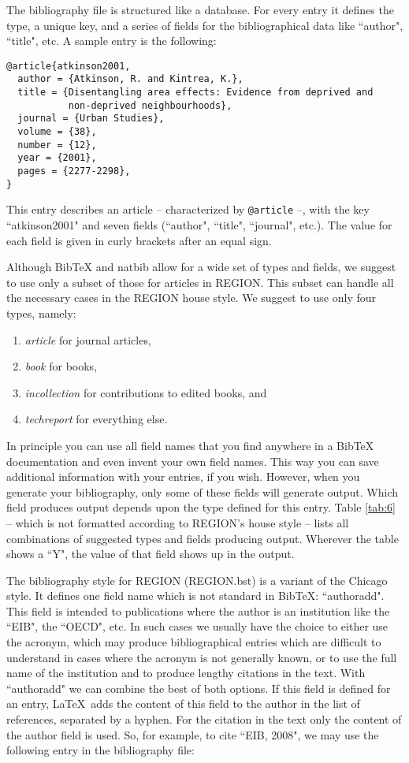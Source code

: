 \documentclass[a4paper,twoside]{article}
\begin{document}
The bibliography file is structured like a database. For every entry it defines the type, a unique key, and a series of fields for the bibliographical data like ``author", ``title", etc. A sample entry is the following:

\begin{verbatim}
@article{atkinson2001,
  author = {Atkinson, R. and Kintrea, K.},
  title = {Disentangling area effects: Evidence from deprived and 
           non-deprived neighbourhoods},
  journal = {Urban Studies},
  volume = {38},
  number = {12},
  year = {2001},
  pages = {2277-2298},
}
\end{verbatim}

This entry describes an article -- characterized by \verb|@article| --, with the key ``atkinson2001" and seven fields (``author", ``title", ``journal", etc.). The value for each field is given in curly brackets after an equal sign.

Although BibTeX and natbib allow for a wide set of types and fields, we suggest to use only a subset of those for articles in REGION. This subset can handle all the necessary cases in the REGION house style. We suggest to use only four types, namely:
\begin{enumerate}
  \item \emph{article} for journal articles,
  \item \emph{book} for books,
  \item \emph{incollection} for contributions to edited books, and
  \item \emph{techreport} for everything else.
\end{enumerate}

In principle you can use all field names that you find anywhere in a BibTeX documentation and even invent your own field names. This way you can save additional information with your entries, if you wish. However, when you generate your bibliography, only some of these fields will generate output. Which field produces output depends upon the type defined for this entry. Table \ref{tab:6} -- which is not formatted according to REGION's house style -- lists all combinations of suggested types and fields producing output. Wherever the table shows a ``Y", the value of that field shows up in the output.

The bibliography style for REGION (REGION.bst) is a variant of the Chicago style. It defines one field name which is not standard in BibTeX: ``authoradd". This field is intended to publications where the author is an institution like the ``EIB", the ``OECD", etc. In such cases we usually have the choice to either use the acronym, which may produce bibliographical entries which are difficult to understand in cases where the acronym is not generally known, or to use the full name of the institution and to produce lengthy citations in the text. With  ``authoradd" we can combine the best of both options. If this field is defined for an entry, \LaTeX\ adds the content of this field to the author in the list of references, separated by a hyphen. For the citation in the text only the content of the author field is used. So, for example, to cite ``EIB, 2008", we may use the following entry in the bibliography file:
\end{document}
